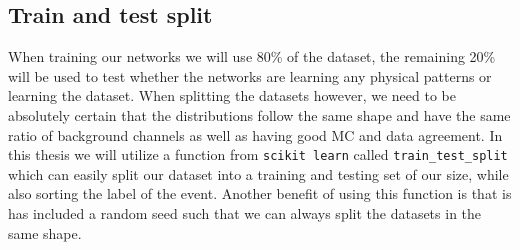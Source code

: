 \documentclass[12pt, a4paper]{book}
\begin{document}
\subsection{Train and test split}\label{sec:train_test}
When training our networks we will use 80\% of the dataset, the remaining 20\% will be used to test whether the networks are learning any physical patterns or learning the dataset. When splitting the datasets however, we need to be absolutely certain that the distributions 
follow the same shape and have the same ratio of background channels as well as having good MC and data agreement. In this thesis we will utilize a function from \verb|scikit learn| \cite{scikit-learn} called \verb|train_test_split| which can easily split our dataset into 
a training and testing set of our size, while also sorting the label of the event. Another benefit of using this function is that is has included a random seed such that we can always split the datasets in the same shape.
\graphicspath{{../../../Plots/Data_Analysis/train_test_split/}}
\end{document}
